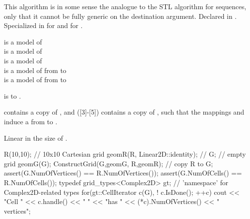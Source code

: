 This algorithm is in some sense the analogue to the STL
 algorithm for sequences,
only that it cannot be fully generic on the destination argument.
Declared in .
\\
Specialized in 
for 
and
for .



 is a model of 
\\
 is a model of 
\\ 
 is a model of 
\\
 is a model of 
from  to 
\\
 is a model of 
from  to 

 is  to 
.

 contains a copy of ,
and ([3]-[5])  contains a copy of 
,
such that the mappings 
 and  induce a 
from  to .

Linear in the size of .

\begin{example}
 R(10,10);  // 10x10 Cartesian grid
  geomR(R, Linear2D::identity); // 
 G;         // empty grid
 geomG(G);
ConstructGrid(G,geomG, R,geomR); // copy R to G;
assert(G.NumOfVertices() == R.NumOfVertices());
assert(G.NumOfCells()    == R.NumOfCells());
typedef grid\_types<Complex2D> gt; // 'namespace' for Complex2D-related types 
for(gt::CellIterator c(G), ! c.IsDone(); ++c)
  cout << "Cell " << c.handle() << "  "
       << "has "  << (*c).NumOfVertices() << " vertices";
\end{example}

